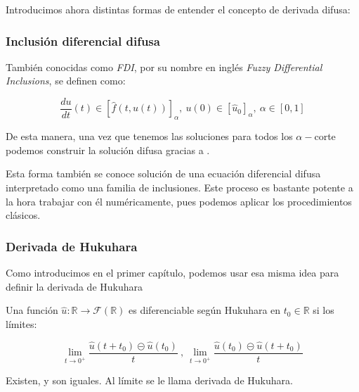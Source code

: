 {Introducimos ahora distintas formas de entender el concepto de derivada difusa:

\subsubsection{Inclusión diferencial difusa}
También conocidas como \textit{FDI}, por su nombre en inglés \textit{Fuzzy Differential Inclusions}, se definen como:

\[
	\frac{d u}{dt} (t) \in [\hat{f} (t, u(t))]_\alpha, ~ u(0) \in [\hat{u}_0]_\alpha, ~ \alpha \in [0, 1]
\]

De esta manera, una vez que tenemos las soluciones para todos los $\alpha-$corte podemos construir la solución difusa gracias a  \cite{apuntesfuzzy}. 

Esta forma también se conoce solución de una ecuación diferencial difusa interpretado como una familia de inclusiones. Este proceso es bastante potente a la hora trabajar con él numéricamente, pues podemos aplicar los procedimientos clásicos.

\subsubsection{Derivada de Hukuhara}
Como introducimos en el primer capítulo, podemos usar esa misma idea para definir la derivada de Hukuhara
\begin{definicion}
	Una función $\hat{u} : \mathbb{R} \rightarrow \mathcal{F}(\mathbb{R})$ es diferenciable según Hukuhara en $t_0 \in \mathbb{R}$ si los límites:
	
	\[
		\lim\limits_{t \rightarrow 0^+} \frac{\hat{u} (t + t_0) \circleddash \hat{u}(t_0)}{t} ~ , ~ \lim\limits_{t \rightarrow 0^+} \frac{ \hat{u}(t_0) \circleddash \hat{u} (t + t_0)}{t}
	\]
	
	Existen, y son iguales. Al límite se le llama derivada de Hukuhara.
\end{definicion}
}